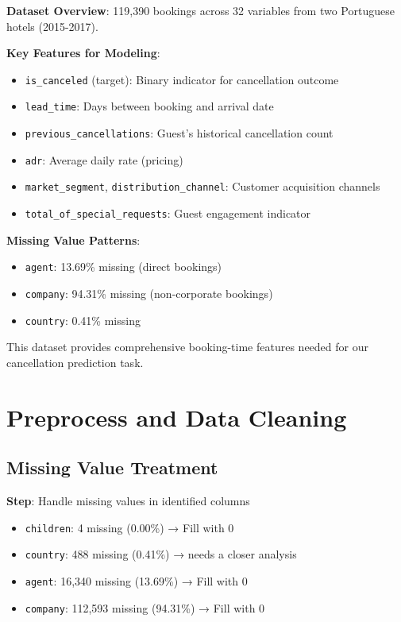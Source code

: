 \documentclass[
  letterpaper,
  DIV=11,
  numbers=noendperiod]{scrartcl}
\providecommand{\tightlist}{%
  \setlength{\itemsep}{0pt}\setlength{\parskip}{0pt}}
\begin{document}
\textbf{Dataset Overview}: 119,390 bookings across 32 variables from two
Portuguese hotels (2015-2017).

\textbf{Key Features for Modeling}:

\begin{itemize}
\tightlist
\item
  \texttt{is\_canceled} (target): Binary indicator for cancellation
  outcome
\item
  \texttt{lead\_time}: Days between booking and arrival date
\item
  \texttt{previous\_cancellations}: Guest's historical cancellation
  count
\item
  \texttt{adr}: Average daily rate (pricing)
\item
  \texttt{market\_segment}, \texttt{distribution\_channel}: Customer
  acquisition channels
\item
  \texttt{total\_of\_special\_requests}: Guest engagement indicator
\end{itemize}

\textbf{Missing Value Patterns}:

\begin{itemize}
\tightlist
\item
  \texttt{agent}: 13.69\% missing (direct bookings)
\item
  \texttt{company}: 94.31\% missing (non-corporate bookings)
\item
  \texttt{country}: 0.41\% missing
\end{itemize}

This dataset provides comprehensive booking-time features needed for our
cancellation prediction task.

\section{Preprocess and Data
Cleaning}\label{preprocess-and-data-cleaning}

\subsection{Missing Value Treatment}\label{missing-value-treatment}

\textbf{Step}: Handle missing values in identified columns

\begin{itemize}
\tightlist
\item
  \texttt{children}: 4 missing (0.00\%) → Fill with 0
\item
  \texttt{country}: 488 missing (0.41\%) → needs a closer analysis
\item
  \texttt{agent}: 16,340 missing (13.69\%) → Fill with 0
\item
  \texttt{company}: 112,593 missing (94.31\%) → Fill with 0
\end{itemize}
\end{document}
